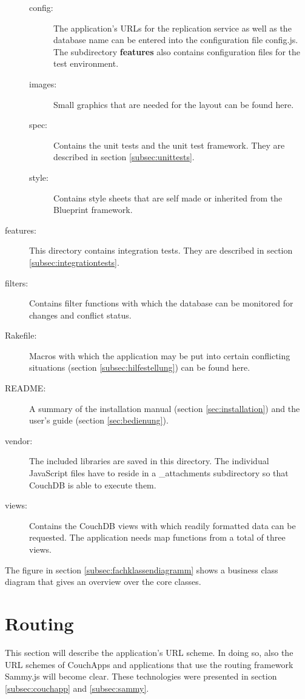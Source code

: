 \begin{description}
\begin{description}
      \item[config:] The application's URLs for the replication service as well as the database name can be entered into the configuration file {\selectfont config.js}. The subdirectory \textbf{features} also contains configuration files for the test environment.
      \item[images:] Small graphics that are needed for the layout can be found here.
      \item[spec:] Contains the unit tests and the unit test framework. They are described in section \ref{subsec:unittests}.
      \item[style:] Contains style sheets that are self made or inherited from the Blueprint framework.
    \end{description}
  
  \item[features:] This directory contains integration tests. They are described in section \ref{subsec:integrationtests}.
  \item[filters:] Contains filter functions with which the database can be monitored for changes and conflict status.
  \item[Rakefile:] Macros with which the application may be put into certain conflicting situations (section \ref{subsec:hilfestellung}) can be found here.
  \item[README:] A summary of the installation manual (section \ref{sec:installation}) and the user's guide (section \ref{sec:bedienung}).
  \item[vendor:] The included libraries are saved in this directory. The individual JavaScript files have to reside in a {\selectfont \_attachments} subdirectory so that CouchDB is able to execute them.
  \item[views:] Contains the CouchDB views with which readily formatted data can be requested. The application needs map functions from a total of three views.
\end{description}

The figure in section \ref{subsec:fachklassendiagramm} shows a business class diagram that gives an overview over the core classes.


\section{Routing}
\label{subsec:routes}

This section will describe the application's URL scheme. In doing so, also the URL schemes of CouchApps and applications that use the routing framework Sammy.js will become clear. These technologies were presented in section \ref{subsec:couchapp} and \ref{subsec:sammy}.

